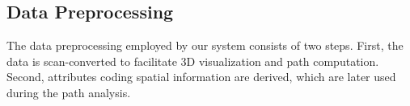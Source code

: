 \documentclass[review,journal]{vgtc}         %
\begin{document}
\subsection{Data Preprocessing} \label{sec:overview:preprocessing}
The data preprocessing employed by our system consists of two steps. First, the data is scan-converted to facilitate 3D visualization and path computation. Second, attributes coding spatial information are derived, which are later used during the path analysis.

\begin{figure}
	\centering
	\hfill
	\hfill
\end{figure}
\end{document}
